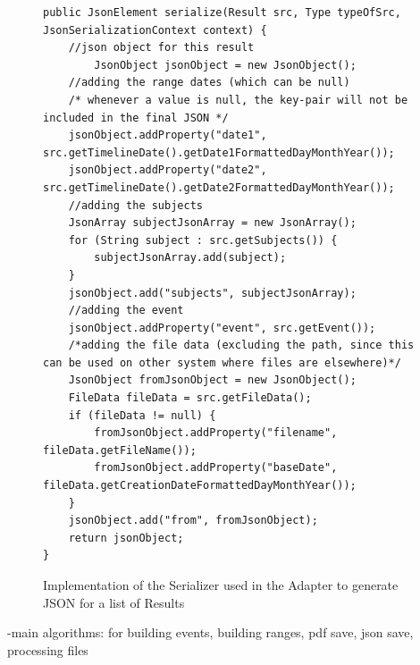 \begin{figure}[H]
\begin{lstlisting}
public JsonElement serialize(Result src, Type typeOfSrc, JsonSerializationContext context) {
	//json object for this result
    	JsonObject jsonObject = new JsonObject();
	//adding the range dates (which can be null)
	/* whenever a value is null, the key-pair will not be included in the final JSON */
	jsonObject.addProperty("date1", src.getTimelineDate().getDate1FormattedDayMonthYear());
	jsonObject.addProperty("date2", src.getTimelineDate().getDate2FormattedDayMonthYear());
	//adding the subjects
	JsonArray subjectJsonArray = new JsonArray();
	for (String subject : src.getSubjects()) {
		subjectJsonArray.add(subject);
	}
	jsonObject.add("subjects", subjectJsonArray);
	//adding the event
	jsonObject.addProperty("event", src.getEvent());
	/*adding the file data (excluding the path, since this can be used on other system where files are elsewhere)*/
	JsonObject fromJsonObject = new JsonObject();
	FileData fileData = src.getFileData();
	if (fileData != null) {
		fromJsonObject.addProperty("filename", fileData.getFileName());
		fromJsonObject.addProperty("baseDate", fileData.getCreationDateFormattedDayMonthYear());
	}
	jsonObject.add("from", fromJsonObject);
	return jsonObject;
}
\end{lstlisting}
\caption{Implementation of the Serializer used in the Adapter to generate JSON for a list of Results}
\label{fig:adapterGsonImplemented}
\end{figure}

-main algorithms: for building events, building ranges, pdf save, json save, processing files
